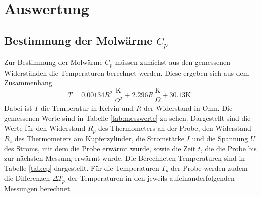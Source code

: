 \section{Auswertung}
\label{sec:Auswertung}

\subsection{Bestimmung der Molwärme $C_p$}
\label{subsec:cp}
Zur Bestimmung der Molwärme $C_p$ müssen zunächst aus den gemessenen
Widerständen die Temperaturen berechnet werden. Diese ergeben sich aus dem
Zusammenhang
\begin{equation*}
  T=0.00134R^2\,\frac{\text{K}}{\Omega^2}+2.296R\,\frac{\text{K}}{\Omega}+30.13\text{K} \,.
\end{equation*}
Dabei ist $T$ die Temperatur in Kelvin und $R$ der Widerstand in Ohm.
Die gemessenen Werte sind in Tabelle \ref{tab:messwerte} zu sehen.
Dargestellt sind die Werte für den Widerstand $R_p$ des Thermometers an der Probe,
den Widerstand $R_z$ des Thermometers am Kupferzylinder, die Stromstärke $I$ und
die Spannung $U$ des Stroms, mit dem die Probe erwärmt wurde, sowie die Zeit $t$,
die die Probe bis zur nächsten Messung erwärmt wurde.
Die Berechneten Temperaturen sind in Tabelle \ref{tab:cp} dargestellt. Für die
Temperaturen $T_p$ der Probe werden zudem die Differenzen $\Delta T_p$ der Temperaturen
in den jeweils aufeinanderfolgenden Messungen berechnet.

